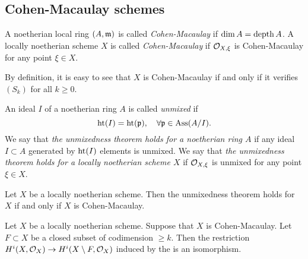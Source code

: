 \subsection{Cohen-Macaulay schemes}

    \begin{definition}
        A noetherian local ring $(A,{\mathfrak{m}})$ is called \textit{Cohen-Macaulay} if $\dim A = \operatorname{depth} A$.
        A locally noetherian scheme $X$ is called \textit{Cohen-Macaulay} if ${\mathcal{O}}_{X,\xi}$ is Cohen-Macaulay for any point $\xi \in X$.
    \end{definition}

    By definition, it is easy to see that $X$ is Cohen-Macaulay if and only if it verifies $(S_k)$ for all $k \geq 0$.

    \begin{example}

    \end{example}

    \begin{definition}
        An ideal $I$ of a noetherian ring $A$ is called \textit{unmixed} if 
        \[ \operatorname{ht}(I) = \operatorname{ht}({\mathfrak{p}}), \quad \forall {\mathfrak{p}} \in \operatorname{Ass}(A/I). \]
        We say that \textit{the unmixedness theorem holds for a noetherian ring $A$} if any ideal $I \subset A$ generated by $\operatorname{ht}(I)$ elements is unmixed.
        We say that \textit{the unmixedness theorem holds for a locally noetherian scheme $X$} if ${\mathcal{O}}_{X,\xi}$ is unmixed for any point $\xi \in X$.
    \end{definition}

    \begin{proposition}\label{prop: induction on S_k conditions}
    \end{proposition}

    \begin{theorem}
        Let $X$ be a locally noetherian scheme.
        Then the unmixedness theorem holds for $X$ if and only if $X$ is Cohen-Macaulay.
    \end{theorem}

    \begin{theorem}
        Let $X$ be a locally noetherian scheme.
        Suppose that $X$ is Cohen-Macaulay.
        Let $F \subset X$ be a closed subset of codimension $\geq k$.
        Then the restriction $H^i(X,{\mathcal{O}}_X) \to H^i(X\setminus F, {\mathcal{O}}_{X})$ induced by the 
         is an isomorphism.
    \end{theorem}


